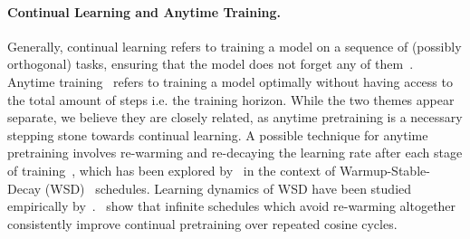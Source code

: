 \documentclass{article}
\theoremstyle{plain}
\begin{document}
\paragraph{Continual Learning and Anytime Training.} Generally, continual learning refers to training a model on a sequence of (possibly orthogonal) tasks, ensuring that the model does not forget any of them~\citep{wang2024comprehensive, aljundi2019online, veniat2020efficient, cossu2024continual, ramasesh2021effect, mehta2023empirical, joudaki2025barriers}. Anytime training~\citep{caccia2022anytime,ibrahim2024simple, gupta2023continual} refers to training a model optimally without having access to the total amount of steps i.e. the training horizon. While the two themes appear separate, we believe they are closely related, as anytime pretraining is a necessary stepping stone towards continual learning. A possible technique for anytime pretraining involves re-warming and re-decaying the learning rate after each stage of training~\citep{ibrahim2024simple}, which has been explored by~\citet{wen2024understanding} in the context of Warmup-Stable-Decay (WSD)~\citep{hu2024minicpm} schedules. Learning dynamics of WSD have been studied empirically by~\citep{belloni2026universal}.~\citet{singh2025beyond} show that infinite schedules which avoid re-warming altogether consistently improve continual pretraining over repeated cosine cycles.
\end{document}
